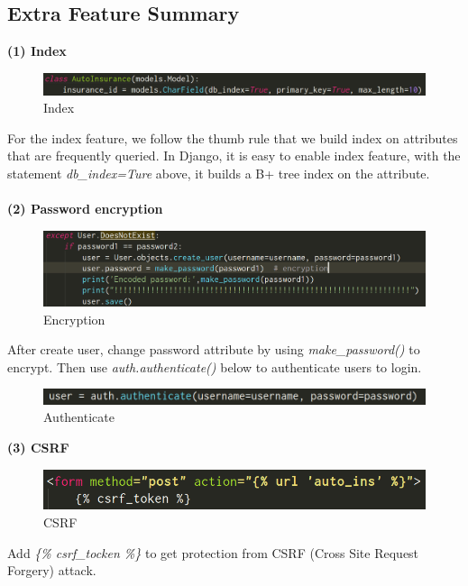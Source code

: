 \documentclass[12pt]{article}
\begin{document}
	
	
	\subsection{Extra Feature Summary}
	\textbf{(1) Index}
	\begin{figure}[H]
		\centering
		\includegraphics[scale=0.3]{index.png}
		\caption{Index}
	\end{figure}
	For the index feature, we follow the thumb rule that we build index on attributes that are frequently queried. In Django, it is easy to enable index feature, with the statement \textit{db\_index=Ture} above, it builds a B+ tree index on the attribute.
    \\\\
    \noindent\textbf{(2) Password encryption}
    \begin{figure}[H]
    	\centering
    	\includegraphics[scale=0.3]{encryption.png}
    	\caption{Encryption}
    \end{figure}
    After create user, change password attribute by using \textit{make\_password()} to encrypt. Then use \textit{auth.authenticate()} below to authenticate users to login.
    \begin{figure}[H]
    	\centering
    	\includegraphics[scale=0.4]{authenticate.png}
    	\caption{Authenticate}
    \end{figure}

    \newpage
    \noindent\textbf{(3) CSRF}
    \begin{figure}[H]
    	\centering
    	\includegraphics[scale=0.49]{csrf.png}
    	\caption{CSRF}
    \end{figure}
    Add \textit{ \{\% csrf\_tocken \%\} } to get protection from CSRF (Cross Site Request Forgery) attack.\\
	
\end{document}
